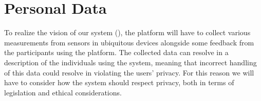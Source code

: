 
\section{Personal Data}
\label{sec:personal_data}

To realize the vision of our system (), the platform will have to collect various measurements from sensors in ubiquitous devices alongside some feedback from the participants using the platform. The collected data can resolve in a description of the individuals using the system, meaning that incorrect handling of this data could resolve in violating the users' privacy. For this reason we will have to consider how the system should respect privacy, both in terms of legislation and ethical considerations.



